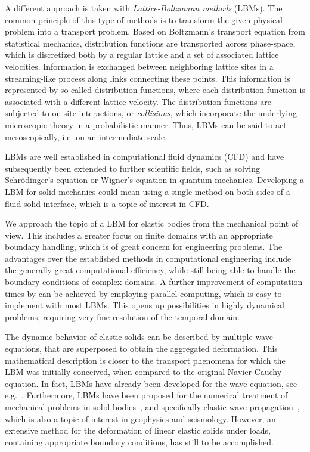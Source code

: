 \documentclass{article}
\begin{document}
A different approach is taken with \emph{Lattice-Boltzmann methods} (LBMs). The common principle of this type of methods is to transform the given physical problem into a transport problem. Based on Boltzmann's transport equation from statistical mechanics, distribution functions are transported across phase-space, which is discretized both by a regular lattice and a set of associated lattice velocities.
Information is exchanged between neighboring lattice sites in a streaming-like process along links connecting these points.
This information is represented by so-called distribution functions, where each distribution function is associated with a different lattice velocity. The distribution functions are subjected to on-site interactions, or \textsl{collisions}, which incorporate the underlying microscopic theory in a probabilistic manner. Thus, LBMs can be said to act mesoscopically, i.e. on an intermediate scale.

LBMs are well established in computational fluid dynamics (CFD) and have subsequently been extended to further scientific fields, such as solving Schrödinger's equation \cite{succi_numerical_1996} or Wigner's equation \cite{solorzano_lattice_2018} in quantum mechanics.
Developing a LBM for solid mechanics could mean using a single method on both sides of a fluid-solid-interface, which is a topic of interest \cite{bungartz_fluid-structure_2006} in CFD.

We approach the topic of a LBM for elastic bodies from the mechanical point of view. This includes a greater focus on finite domains with an appropriate boundary handling, which is of great concern for engineering problems. 
The advantages over the established methods in computational engineering include the generally great computational efficiency, while still being able to handle the boundary conditions of complex domains. A further improvement of computation times by can be achieved by employing parallel computing, which is easy to implement with most LBMs. This opens up possibilities in highly dynamical problems, requiring very fine resolution of the temporal domain.

The dynamic behavior of  elastic solids can be described by multiple wave equations, that are superposed to obtain the aggregated deformation. This mathematical description is closer to the transport phenomena for which the LBM was initially conceived, when compared to the original Navier-Cauchy equation. In fact, LBMs have already been developed for the wave equation, see e.g.~\cite{yan_lattice_2000,chopard_cellular_1998,frantziskonis_lattice_2011}.
Furthermore, LBMs have been proposed for the numerical treatment of mechanical problems in solid bodies~\cite{chopard_lattice_1998,chopard_lattice_1999,marconi_lattice_2003,mora_lattice_1992,yin_direct_2016,murthy_lattice_2018,escande_lattice_2020}, and specifically elastic wave propagation~\cite{dhuri_numerical_2017,jiang_acoustic_2019}, which is also a topic of interest in geophysics and seismology. However, an extensive method for the deformation of linear elastic solids under loads, containing appropriate boundary conditions, has still to be accomplished.
\end{document}
